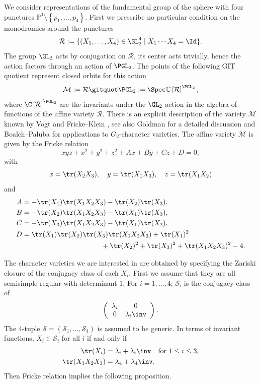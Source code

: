 We consider representations of the fundamental group of the sphere with four punctures $\mathbb{P}^1\setminus \left\lbrace p_1,\dots,p_4\right\rbrace$. First we prescribe no particular condition on the monodromies around the punctures
\begin{equation*}
\mathcal{R}:=\lbrace (X_1,\dots,X_4)\in\SL_2^4\mid X_1\cdots X_4=\Id\rbrace.
\end{equation*}
The group $\GL_2$ acts by conjugation on $\mathcal R$, its center acts trivially, hence the action factors through an action of $\PGL_2$. The points of the following GIT quotient represent closed orbits for this action
\begin{equation*}
\mathcal{M}:=\mathcal{R}\gitquot\PGL_2:=\Spec \mathbb{C} \left[\mathcal R\right]^{\PGL_2},
\end{equation*}
where $\C \left[\mathcal R\right]^{\PGL_2}$ are the invariants under the $\GL_2$ action in the algebra of functions of the affine variety $\mathcal{R}$. There is an explicit description of the variety $\mathcal{M}$ known by Vogt \cite{Vogt} and Fricke--Klein \cite{Fricke_Klein}, see also Goldman \cite{Goldman2009} for a detailed discussion and Boalch--Paluba \cite{Boalch_Paluba} for applications to $G_2$-character varieties. The affine variety $\mathcal{M}$ is given by the Fricke relation
\begin{equation}\label{eq_fricke_rel}
x y z + x^2 +y^2 + z^2 + A x + B y + C z + D =0,
\end{equation}
with
\[
x=\tr(X_2 X_3), \quad y=\tr(X_1 X_3),\quad z=\tr(X_1 X_2)
\]
and
\begin{align*}
A &= -\tr(X_1)\tr(X_1 X_2 X_3) -\tr(X_2)\tr(X_3), \\
B &= -\tr(X_2)\tr(X_1 X_2 X_3)-\tr(X_1)\tr(X_3), \\
C &= -\tr(X_3)\tr(X_1 X_2 X_3) -\tr(X_1)\tr(X_2), \\
D &= \tr(X_1)\tr(X_2)\tr(X_3)\tr(X_1 X_2 X_3) + \tr(X_1)^2 \\
& \hspace*{3.95cm}+ \tr(X_2)^2 + \tr(X_3)^2 + \tr(X_1 X_2 X_3)^2 -4.
\end{align*}

The character varieties we are interested in are obtained by specifying the Zariski closure of the conjugacy class of each $X_i$. First we assume that they are all semisimple regular with determinant $1$. For $i=1,\dots, 4$; $\mathcal{S}_i$ is the conjugacy class of
\begin{equation}\label{conj2}
\left(\begin{array}{cc}
\lambda_i & 0 \\
0 & \lambda_i\inv
\end{array}\right).
\end{equation}
The $4$-tuple $\boldsymbol{\mathcal{S}}=\left(\mathcal{S}_1,\dots, \mathcal{S}_4\right)$ is assumed to be generic.
In terms of invariant functions, $X_i\in\mathcal{S}_i$ for all $i$ if and only if
\begin{align*}
\tr(X_i) &= \lambda_i+\lambda_i \inv \quad \text{for }1 \le i \le 3, \\
\tr(X_1 X_2 X_3) &= \lambda_4+\lambda_4\inv.
\end{align*}
Then Fricke relation implies the following proposition.

